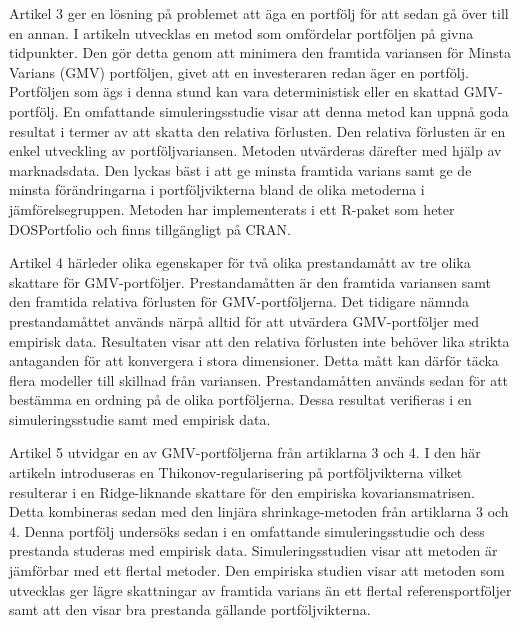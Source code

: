 Artikel 3 ger en lösning på problemet att äga en portfölj för att sedan gå över till en annan.
I artikeln utvecklas en metod som omfördelar portföljen på givna tidpunkter.
Den gör detta genom att minimera den framtida variansen för Minsta Varians (GMV) portföljen, givet att en investeraren redan äger en portfölj.
Portföljen som ägs i denna stund kan vara deterministisk eller en skattad GMV-portfölj.
En omfattande simuleringsstudie visar att denna metod kan uppnå goda resultat i termer av att skatta den relativa förlusten.
Den relativa förlusten är en enkel utveckling av portföljvariansen.
Metoden utvärderas därefter med hjälp av marknadsdata.
Den lyckas bäst i att ge minsta framtida varians samt ge de minsta förändringarna i portföljvikterna bland de olika metoderna i jämförelsegruppen.
Metoden har implementerats i ett R-paket som heter DOSPortfolio och finns tillgängligt på CRAN. 

Artikel 4 härleder olika egenskaper för två olika prestandamått av tre olika skattare för GMV-portföljer.
Prestandamåtten är den framtida variansen samt den framtida relativa förlusten för GMV-portföljerna.
Det tidigare nämnda prestandamåttet används närpå alltid för att utvärdera GMV-portföljer med empirisk data.
Resultaten visar att den relativa förlusten inte behöver lika strikta antaganden för att konvergera i stora dimensioner.
Detta mått kan därför täcka flera modeller till skillnad från variansen.
Prestandamåtten används sedan för att bestämma en ordning på de olika portföljerna.
Dessa resultat verifieras i en simuleringsstudie samt med empirisk data. 

Artikel 5 utvidgar en av GMV-portföljerna från artiklarna 3 och 4.
I den här artikeln introduseras en Thikonov-regularisering på portföljvikterna vilket resulterar i en Ridge-liknande skattare för den empiriska kovariansmatrisen.
Detta kombineras sedan med den linjära shrinkage-metoden från artiklarna 3 och 4.
Denna portfölj undersöks sedan i en omfattande simuleringsstudie och dess prestanda studeras med empirisk data.
Simuleringsstudien visar att metoden är jämförbar med ett flertal metoder.
Den empiriska studien visar att metoden som utvecklas ger lägre skattningar av framtida varians än ett flertal referensportföljer samt att den visar bra prestanda gällande portföljvikterna.